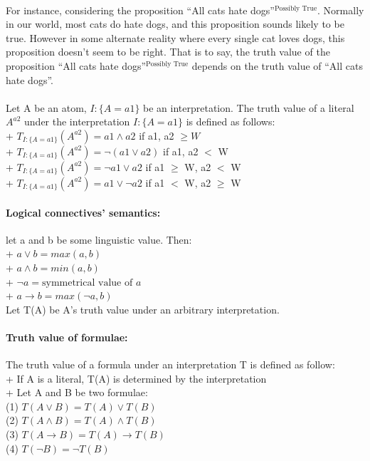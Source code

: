 \documentclass[part1.tex]{subfiles}
\begin{document}
\paragraph{} For instance, considering the proposition ``All cats
hate dogs''$^{\text{Possibly True}}$. Normally in our world, most
cats do hate dogs, and this proposition sounds likely to be true.
However in some alternate reality where every single cat
loves dogs, this proposition doesn't seem to be right. That is to
say, the truth value of the proposition ``All cats hate dogs''$^{\text{Possibly True}}$
depends on the truth value of ``All cats hate dogs''.

\paragraph{} Let A be an atom, $I:\{A=a1\}$ be an interpretation.
The truth value of a literal $A^{a2}$ under the interpretation
$I:\{A = a1\}$ is defined as follows:\\
\indent + \(T_{I:\{A = a1\}}(A^{a2}) = a1 \wedge a2 \) if a1, a2 \(\ge W\)\\
\indent + \(T_{I:\{A = a1\}}(A^{a2}) = \neg (a1 \vee a2) \) if a1, a2 \(<\) W\\
\indent + \(T_{I:\{A = a1\}}(A^{a2}) = \neg a1 \vee a2 \) if a1 \(\ge\) W, a2 \(<\) W\\
\indent + \(T_{I:\{A = a1\}}(A^{a2}) =  a1 \vee \neg a2 \) if a1 \(<\) W, a2 \(\ge\) W\\

\paragraph{Logical connectives' semantics:} let a and b be some linguistic value. Then:\\
\indent + \(a \vee b = max(a,b)\)\\
\indent + \(a \wedge b = min(a,b)\)\\
\indent + \(\neg a = \text{symmetrical value of } a\)\\
\indent + \(a \to b = max(\neg a,b)\)\\

Let T(A) be A's truth value under an arbitrary interpretation.\\
\paragraph{Truth value of formulae:} The truth value of a formula
under an interpretation T is defined as follow:\\
\indent + If A is a literal, T(A) is determined by the interpretation\\
\indent + Let A and B be two formulae:\\
\indent \indent (1) \(T(A\vee B) = T(A) \vee T(B)\)\\
\indent \indent (2) \(T(A\wedge B) = T(A) \wedge T(B)\)\\
\indent \indent (3) \(T(A\to B) = T(A) \to T(B)\)\\
\indent \indent (4) \(T(\neg B) = \neg T(B)\)
\end{document}
